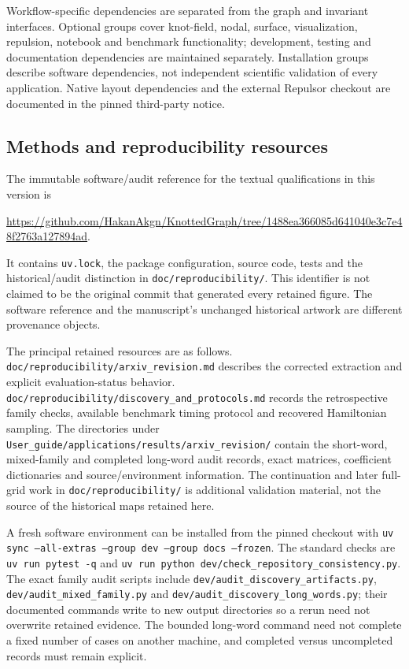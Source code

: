 Workflow-specific dependencies are separated from the graph and invariant interfaces. Optional groups cover knot-field, nodal, surface, visualization, repulsion, notebook and benchmark functionality; development, testing and documentation dependencies are maintained separately. Installation groups describe software dependencies, not independent scientific validation of every application. Native layout dependencies and the external Repulsor checkout are documented in the pinned third-party notice.

\subsection{Methods and reproducibility resources}
\label{supp:reproducibility_resources}
The immutable software/audit reference for the textual qualifications in this version is
\begin{center}
\url{https://github.com/HakanAkgn/KnottedGraph/tree/1488ea366085d641040e3c7e48f2763a127894ad}.
\end{center}
It contains \texttt{uv.lock}, the package configuration, source code, tests and the historical/audit distinction in \texttt{doc/reproducibility/}. This identifier is not claimed to be the original commit that generated every retained figure. The software reference and the manuscript's unchanged historical artwork are different provenance objects.

The principal retained resources are as follows. \texttt{doc/reproducibility/arxiv\_revision.md} describes the corrected extraction and explicit evaluation-status behavior. \texttt{doc/reproducibility/discovery\_and\_protocols.md} records the retrospective family checks, available benchmark timing protocol and recovered Hamiltonian sampling. The directories under \texttt{User\_guide/applications/results/arxiv\_revision/} contain the short-word, mixed-family and completed long-word audit records, exact matrices, coefficient dictionaries and source/environment information. The continuation and later full-grid work in \texttt{doc/reproducibility/} is additional validation material, not the source of the historical maps retained here.

A fresh software environment can be installed from the pinned checkout with \texttt{uv sync --all-extras --group dev --group docs --frozen}. The standard checks are \texttt{uv run pytest -q} and \texttt{uv run python dev/check\_repository\_consistency.py}. The exact family audit scripts include \texttt{dev/audit\_discovery\_artifacts.py}, \texttt{dev/audit\_mixed\_family.py} and \texttt{dev/audit\_discovery\_long\_words.py}; their documented commands write to new output directories so a rerun need not overwrite retained evidence. The bounded long-word command need not complete a fixed number of cases on another machine, and completed versus uncompleted records must remain explicit.

